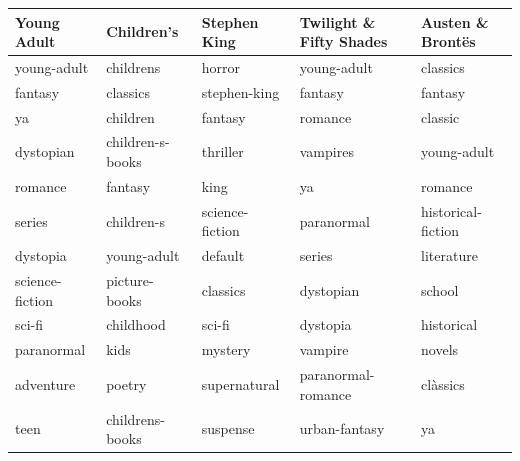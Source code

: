 \documentclass[handout]{beamer}
\begin{document}
\begin{frame}
 

\begin{table}
\centering
\begin{tabular}{lllHZ}
\toprule
     Young Adult &        Children's &     Stephen King & Twilight \& Fifty Shades &    Austen \& Bront\"es \\
\midrule
     young-adult &         childrens &           horror &             young-adult &            classics \\
         fantasy &          classics &     stephen-king &                 fantasy &             fantasy \\
              ya &          children &          fantasy &                 romance &             classic \\
       dystopian &  children-s-books &         thriller &                vampires &         young-adult \\
         romance &           fantasy &             king &                      ya &             romance \\
          series &        children-s &  science-fiction &              paranormal &  historical-fiction \\
        dystopia &       young-adult &          default &                  series &          literature \\
 science-fiction &     picture-books &         classics &               dystopian &              school \\
          sci-fi &         childhood &           sci-fi &                dystopia &          historical \\
      paranormal &              kids &          mystery &                 vampire &              novels \\
       adventure &            poetry &     supernatural &      paranormal-romance &            cl\`assics \\
            teen &   childrens-books &         suspense &           urban-fantasy &                  ya \\
\bottomrule
\end{tabular}
\end{table}
\end{frame}
\end{document}
